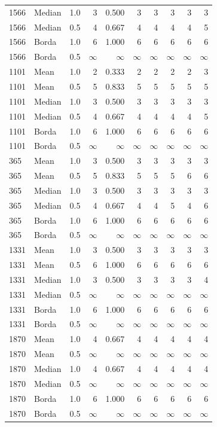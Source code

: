 \begin{longtable}{llrrr rr r rr}
1566 & Median & 1.0 & 3 & 0.500 & 3 & 3 & 3 & 3 & 3 \\
1566 & Median & 0.5 & 4 & 0.667 & 4 & 4 & 4 & 4 & 5 \\
1566 & Borda & 1.0 & 6 & 1.000 & 6 & 6 & 6 & 6 & 6 \\
1566 & Borda & 0.5 & $\infty$ & $\infty$ & $\infty$ & $\infty$ & $\infty$ & $\infty$ & $\infty$ \\
1101 & Mean & 1.0 & 2 & 0.333 & 2 & 2 & 2 & 2 & 3 \\
1101 & Mean & 0.5 & 5 & 0.833 & 5 & 5 & 5 & 5 & 5 \\
1101 & Median & 1.0 & 3 & 0.500 & 3 & 3 & 3 & 3 & 3 \\
1101 & Median & 0.5 & 4 & 0.667 & 4 & 4 & 4 & 4 & 5 \\
1101 & Borda & 1.0 & 6 & 1.000 & 6 & 6 & 6 & 6 & 6 \\
1101 & Borda & 0.5 & $\infty$ & $\infty$ & $\infty$ & $\infty$ & $\infty$ & $\infty$ & $\infty$ \\
365 & Mean & 1.0 & 3 & 0.500 & 3 & 3 & 3 & 3 & 3 \\
365 & Mean & 0.5 & 5 & 0.833 & 5 & 5 & 5 & 6 & 6 \\
365 & Median & 1.0 & 3 & 0.500 & 3 & 3 & 3 & 3 & 3 \\
365 & Median & 0.5 & 4 & 0.667 & 4 & 4 & 5 & 4 & 6 \\
365 & Borda & 1.0 & 6 & 1.000 & 6 & 6 & 6 & 6 & 6 \\
365 & Borda & 0.5 & $\infty$ & $\infty$ & $\infty$ & $\infty$ & $\infty$ & $\infty$ & $\infty$ \\
1331 & Mean & 1.0 & 3 & 0.500 & 3 & 3 & 3 & 3 & 3 \\
1331 & Mean & 0.5 & 6 & 1.000 & 6 & 6 & 6 & 6 & 6 \\
1331 & Median & 1.0 & 3 & 0.500 & 3 & 3 & 3 & 3 & 4 \\
1331 & Median & 0.5 & $\infty$ & $\infty$ & $\infty$ & $\infty$ & $\infty$ & $\infty$ & $\infty$ \\
1331 & Borda & 1.0 & 6 & 1.000 & 6 & 6 & 6 & 6 & 6 \\
1331 & Borda & 0.5 & $\infty$ & $\infty$ & $\infty$ & $\infty$ & $\infty$ & $\infty$ & $\infty$ \\
1870 & Mean & 1.0 & 4 & 0.667 & 4 & 4 & 4 & 4 & 4 \\
1870 & Mean & 0.5 & $\infty$ & $\infty$ & $\infty$ & $\infty$ & $\infty$ & $\infty$ & $\infty$ \\
1870 & Median & 1.0 & 4 & 0.667 & 4 & 4 & 4 & 4 & 4 \\
1870 & Median & 0.5 & $\infty$ & $\infty$ & $\infty$ & $\infty$ & $\infty$ & $\infty$ & $\infty$ \\
1870 & Borda & 1.0 & 6 & 1.000 & 6 & 6 & 6 & 6 & 6 \\
1870 & Borda & 0.5 & $\infty$ & $\infty$ & $\infty$ & $\infty$ & $\infty$ & $\infty$ & $\infty$ \\
\bottomrule\end{longtable}
